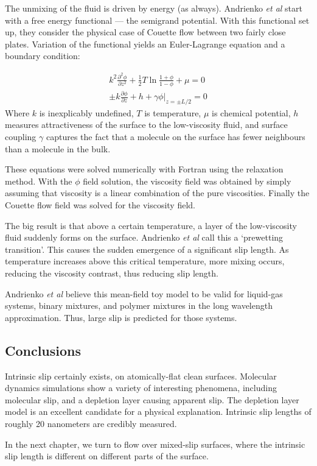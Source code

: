 \documentclass[12pt, a4paper, twoside, openright]{book}
\begin{document}
The unmixing of the fluid is driven by energy (as always).  Andrienko \emph{et al} start with a free energy functional --- the semigrand potential. With this functional set up, they consider the physical case of Couette flow between two fairly close plates. Variation of the functional yields an Euler-Lagrange equation and a boundary condition:

\begin{gather}
 k^{2} \frac{\partial^{2}\phi}{\partial z^{2}} + 
\frac{1}{2}T\ln \frac{1+\phi}{1-\phi} + \mu = 0
\\
\pm k \frac{\partial \phi}{\partial z} + h + \gamma \phi|_{z= \pm L/2} = 0
\end{gather}
Where $k$ is inexplicably undefined, $T$ is temperature, $\mu$ is chemical potential, $h$ measures attractiveness of the surface to the low-viscosity fluid, and surface coupling $\gamma$ captures the fact that a molecule on the surface has fewer neighbours than a molecule in the bulk.

These equations were solved numerically with Fortran using the relaxation method. With the $\phi$ field solution, the viscosity field was obtained by simply assuming that viscosity is a linear combination of the pure viscosities. Finally the Couette flow field was solved for the viscosity field.

The big result is that above a certain temperature, a layer of the low-viscosity fluid suddenly forms on the surface.  Andrienko \emph{et al} call this a `prewetting transition'.  This causes the sudden emergence of a significant slip length.  As temperature increases above this critical temperature, more mixing occurs, reducing the viscosity contrast, thus reducing slip length.

Andrienko \emph{et al} believe this mean-field toy model to be valid for liquid-gas systems, binary mixtures, and polymer mixtures in the long wavelength approximation.  Thus, large slip is predicted for those systems.

\subsection*{Conclusions}

Intrinsic slip certainly exists, on atomically-flat clean surfaces.  Molecular dynamics simulations show a variety of interesting phenomena, including molecular slip, and a depletion layer causing apparent slip.  The depletion layer model is an excellent candidate for a physical explanation.  Intrinsic slip lengths of roughly 20 nanometers are credibly measured. 

In the next chapter, we turn to flow over mixed-slip surfaces, 
where the intrinsic slip length is different on different parts of the surface.   




\end{document}
